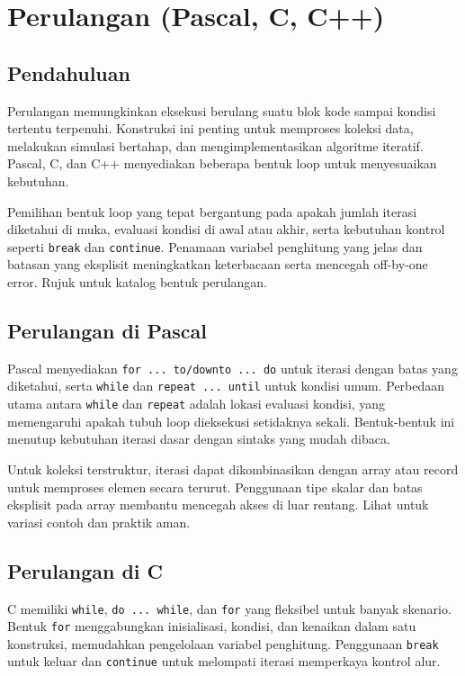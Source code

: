 \documentclass[../main.tex]{subfiles}
\begin{document}
\chapter{Perulangan (Pascal, C, C++)}
\section{Pendahuluan}
Perulangan memungkinkan eksekusi berulang suatu blok kode sampai kondisi tertentu terpenuhi. Konstruksi ini penting untuk memproses koleksi data, melakukan simulasi bertahap, dan mengimplementasikan algoritme iteratif. Pascal, C, dan C++ menyediakan beberapa bentuk loop untuk menyesuaikan kebutuhan.

Pemilihan bentuk loop yang tepat bergantung pada apakah jumlah iterasi diketahui di muka, evaluasi kondisi di awal atau akhir, serta kebutuhan kontrol seperti \texttt{break} dan \texttt{continue}. Penamaan variabel penghitung yang jelas dan batasan yang eksplisit meningkatkan keterbacaan serta mencegah off-by-one error. Rujuk \textcite{free-pascal-docs,gnu-c-manual,cpp-reference} untuk katalog bentuk perulangan.

\section{Perulangan di Pascal}
Pascal menyediakan \texttt{for ... to/downto ... do} untuk iterasi dengan batas yang diketahui, serta \texttt{while} dan \texttt{repeat ... until} untuk kondisi umum. Perbedaan utama antara \texttt{while} dan \texttt{repeat} adalah lokasi evaluasi kondisi, yang memengaruhi apakah tubuh loop dieksekusi setidaknya sekali. Bentuk-bentuk ini menutup kebutuhan iterasi dasar dengan sintaks yang mudah dibaca.

Untuk koleksi terstruktur, iterasi dapat dikombinasikan dengan array atau record untuk memproses elemen secara terurut. Penggunaan tipe skalar dan batas eksplisit pada array membantu mencegah akses di luar rentang. Lihat \textcite{free-pascal-docs,pascal-tutorial-wikibooks} untuk variasi contoh dan praktik aman.

\section{Perulangan di C}
C memiliki \texttt{while}, \texttt{do ... while}, dan \texttt{for} yang fleksibel untuk banyak skenario. Bentuk \texttt{for} menggabungkan inisialisasi, kondisi, dan kenaikan dalam satu konstruksi, memudahkan pengelolaan variabel penghitung. Penggunaan \texttt{break} untuk keluar dan \texttt{continue} untuk melompati iterasi memperkaya kontrol alur.
\end{document}
